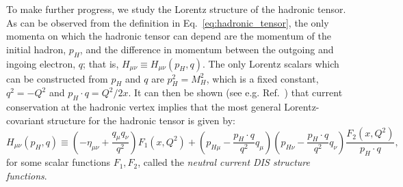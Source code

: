 \documentclass[withindex,glossary]{cam-thesis}
\begin{document}
To make further progress, we study the Lorentz structure of the hadronic tensor. As can be observed from the definition in Eq.~\eqref{eq:hadronic_tensor}, the only momenta on which the hadronic tensor can depend are the momentum of the initial hadron, $p_H$, and the difference in momentum between the outgoing and ingoing electron, $q$; that is, $H_{\mu\nu} \equiv H_{\mu\nu}(p_H, q)$. The only Lorentz scalars which can be constructed from $p_H$ and $q$ are $p_H^2 = M_H^2$, which is a fixed constant, $q^2 = -Q^2$ and $p_H \cdot q = Q^2/2x$. It can then be shown (see e.g. Ref.~\cite{Halzen:1984mc}) that current conservation at the hadronic vertex implies that the most general Lorentz-covariant structure for the hadronic tensor is given by:
\begin{equation}
H_{\mu\nu}(p_H, q) \equiv \left( -\eta_{\mu\nu} + \frac{q_{\mu} q_{\nu}}{q^2} \right) F_1(x,Q^2) + \left( p_{H\mu} - \frac{p_H \cdot q}{q^2} q_{\mu} \right) \left( p_{H\nu} - \frac{p_H \cdot q}{q^2} q_{\nu} \right) \frac{F_2(x,Q^2)}{p_H \cdot q},
\end{equation}
for some scalar functions $F_1, F_2$, called the \textit{neutral current DIS structure functions}.
\end{document}
